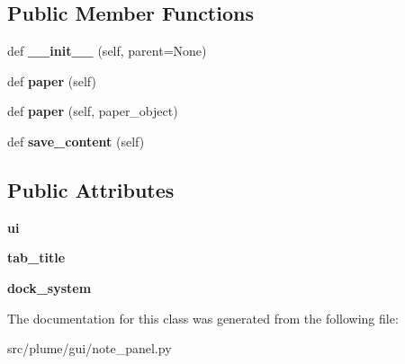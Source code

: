 \subsection*{Public Member Functions}
\begin{DoxyCompactItemize}
\item 
def {\bfseries \+\_\+\+\_\+init\+\_\+\+\_\+} (self, parent=None)\hypertarget{classplume-creator_1_1src_1_1plume_1_1gui_1_1note__panel_1_1_note_sub_window_a15020b4ba740cff93d71ffe141175a27}{}\label{classplume-creator_1_1src_1_1plume_1_1gui_1_1note__panel_1_1_note_sub_window_a15020b4ba740cff93d71ffe141175a27}

\item 
def {\bfseries paper} (self)\hypertarget{classplume-creator_1_1src_1_1plume_1_1gui_1_1note__panel_1_1_note_sub_window_a6a3c16a08fad54821bd5b529adbec250}{}\label{classplume-creator_1_1src_1_1plume_1_1gui_1_1note__panel_1_1_note_sub_window_a6a3c16a08fad54821bd5b529adbec250}

\item 
def {\bfseries paper} (self, paper\+\_\+object)\hypertarget{classplume-creator_1_1src_1_1plume_1_1gui_1_1note__panel_1_1_note_sub_window_a56b9198c539726fbd9dbf41ec057469f}{}\label{classplume-creator_1_1src_1_1plume_1_1gui_1_1note__panel_1_1_note_sub_window_a56b9198c539726fbd9dbf41ec057469f}

\item 
def {\bfseries save\+\_\+content} (self)\hypertarget{classplume-creator_1_1src_1_1plume_1_1gui_1_1note__panel_1_1_note_sub_window_af52f00d190de2ea8c24647b6a19f4495}{}\label{classplume-creator_1_1src_1_1plume_1_1gui_1_1note__panel_1_1_note_sub_window_af52f00d190de2ea8c24647b6a19f4495}

\end{DoxyCompactItemize}
\subsection*{Public Attributes}
\begin{DoxyCompactItemize}
\item 
{\bfseries ui}\hypertarget{classplume-creator_1_1src_1_1plume_1_1gui_1_1note__panel_1_1_note_sub_window_a19b6bb30489deed46ed3fa407a743cbb}{}\label{classplume-creator_1_1src_1_1plume_1_1gui_1_1note__panel_1_1_note_sub_window_a19b6bb30489deed46ed3fa407a743cbb}

\item 
{\bfseries tab\+\_\+title}\hypertarget{classplume-creator_1_1src_1_1plume_1_1gui_1_1note__panel_1_1_note_sub_window_adceea381f9561fbc3a0ff92534f5e49e}{}\label{classplume-creator_1_1src_1_1plume_1_1gui_1_1note__panel_1_1_note_sub_window_adceea381f9561fbc3a0ff92534f5e49e}

\item 
{\bfseries dock\+\_\+system}\hypertarget{classplume-creator_1_1src_1_1plume_1_1gui_1_1note__panel_1_1_note_sub_window_a403093b1c16c9cd3a3fd0be23b9f902d}{}\label{classplume-creator_1_1src_1_1plume_1_1gui_1_1note__panel_1_1_note_sub_window_a403093b1c16c9cd3a3fd0be23b9f902d}

\end{DoxyCompactItemize}


The documentation for this class was generated from the following file\+:\begin{DoxyCompactItemize}
\item 
src/plume/gui/note\+\_\+panel.\+py\end{DoxyCompactItemize}
